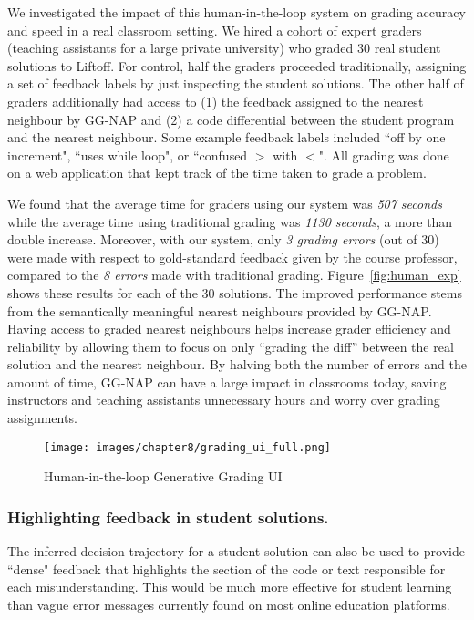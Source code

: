 We investigated the impact of this human-in-the-loop system on grading accuracy and speed in a real classroom setting. We hired a cohort of expert graders (teaching assistants for a large private university) who graded 30 real student solutions to Liftoff. 
For control, half the graders proceeded traditionally, assigning a set of feedback labels by just inspecting the student solutions.  The other half of graders additionally had access to (1) the feedback assigned to the nearest neighbour by GG-NAP and (2) a code differential between the student program and the nearest neighbour. Some example feedback labels included ``off by one increment", ``uses while loop", or ``confused $>$ with $<$". All grading was done on a web application that kept track of the time taken to grade a problem.

We found that the average time for graders using our system was \textit{507 seconds} while the average time using traditional grading was \textit{1130 seconds}, a more than double increase. Moreover, with our system, only \textit{3 grading errors} (out of 30) were made with respect to gold-standard feedback given by the course professor, compared to the \textit{8 errors} made with traditional grading. Figure~\ref{fig:human_exp} shows these results for each of the $30$ solutions. 
The improved performance stems from the semantically meaningful nearest neighbours provided by GG-NAP. Having access to graded nearest neighbours helps increase grader efficiency and reliability by allowing them to focus on only ``grading the diff'' between the real solution and the nearest neighbour. By halving both the number of errors and the amount of time, GG-NAP can have a large impact in classrooms today, saving instructors and teaching assistants unnecessary hours and worry over grading assignments. 

\begin{figure}[t!]
    \centering
    \texttt{[image: images/chapter8/grading\_ui\_full.png]}
    \caption{Human-in-the-loop Generative Grading UI}
    \label{fig:grading_ui_full}
\end{figure}


\subsubsection{Highlighting feedback in student solutions.} 
\label{sec:highlight}

The inferred decision trajectory for a student solution can also be used to provide ``dense" feedback that highlights the section of the code or text responsible for each misunderstanding. This would be much more effective for student learning than vague error messages currently found on most online education platforms. 

